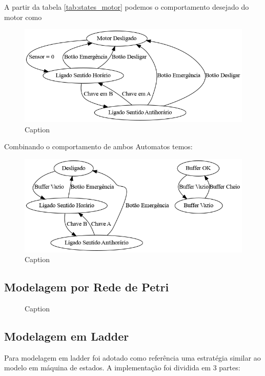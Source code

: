 \documentclass[a4paper,11pt]{article}
\begin{document}
A partir da tabela \ref{tab:states_motor} podemos o comportamento desejado do motor como

\begin{figure}[H]
    \centering
    \includegraphics[width=0.9\linewidth]{src/tex/img/automato_motor.png}
    \caption{Caption}
    \label{fig:automato_motor}
\end{figure}

Combinando o comportamento de ambos Automatos temos:

\begin{figure}[H]
    \centering
    \includegraphics[width=0.9\linewidth]{src/tex/img/automato.png}
    \caption{Caption}
    \label{fig:automato_sistemai }
\end{figure}

\subsection{Modelagem por Rede de Petri}

\begin{figure}[H]
    \centering
    
    \caption{Caption}
    \label{fig:my_label}
\end{figure}

\subsection{Modelagem em Ladder}

Para modelagem em ladder foi adotado como referência uma estratégia similar ao modelo em máquina de estados. A implementação foi dividida em 3 partes:
\end{document}
